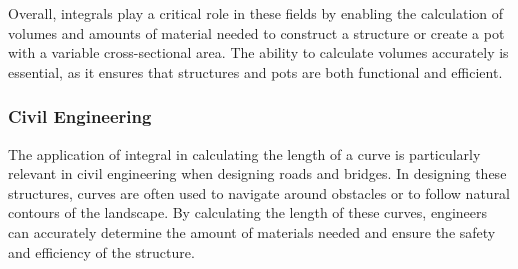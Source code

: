 \documentclass[13pt,a4paper]{report}
\begin{document}
Overall, integrals play a critical role in these fields by enabling the calculation of volumes and amounts of material needed to construct a structure or create a pot with a variable cross-sectional area. The ability to calculate volumes accurately is essential, as it ensures that structures and pots are both functional and efficient.

\subsubsection{Civil Engineering}

The application of integral in calculating the length of a curve is particularly relevant in civil engineering when designing roads and bridges. In designing these structures, curves are often used to navigate around obstacles or to follow natural contours of the landscape. By calculating the length of these curves, engineers can accurately determine the amount of materials needed and ensure the safety and efficiency of the structure.

\vspace{0.25cm}
\end{document}
